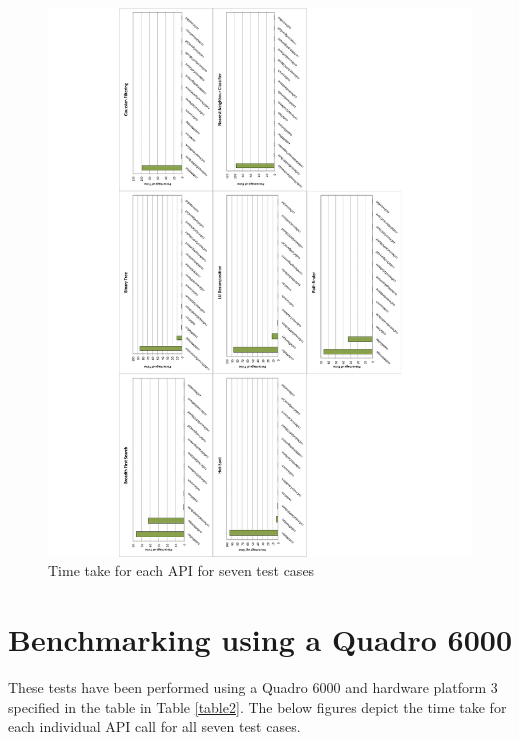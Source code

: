 \documentclass[paper=a4, fontsize=11pt]{scrartcl}
\numberwithin{equation}{section}		%
\numberwithin{figure}{section}			%
\numberwithin{table}{section}				%
\begin{document}
\begin{figure}[!h]
\centering
\includegraphics[scale=0.6]{../imgs/x650.pdf}
\caption{Time take for each API for seven test cases}
\label{Time take for each API for seven test cases}
\end{figure}


\newpage
\section{Benchmarking using a Quadro 6000}
These tests have been performed using a Quadro 6000 and hardware platform 3 specified in the table in Table \ref{table2}. The below figures depict the time take for each individual API call for all seven test cases.
\end{document}
